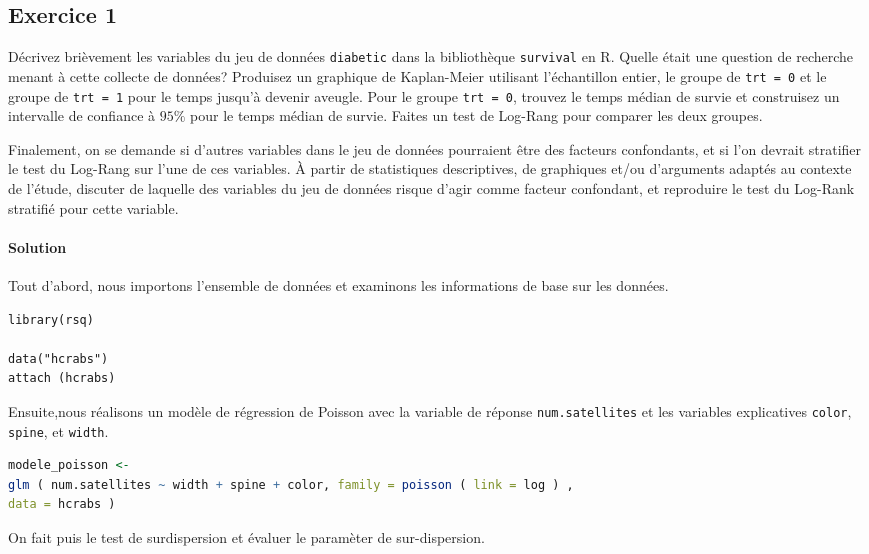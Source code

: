 \documentclass[../main.tex]{subfiles}
\begin{document}
\begin{CJK*}{UTF8}{gbsn}
\section*{Exercice 1}
Décrivez brièvement les variables du jeu de données 
\texttt{diabetic} dans la bibliothèque \texttt{survival} en R.
Quelle était une question de recherche menant à cette collecte de données?
Produisez un graphique de Kaplan-Meier utilisant l'échantillon entier,
le groupe de \texttt{trt = 0} et le groupe de \texttt{trt = 1} 
pour le temps jusqu'à devenir aveugle.
Pour le groupe \texttt{trt = 0}, trouvez le temps médian de survie et
construisez un intervalle de confiance à $95\%$ pour le temps médian de survie.
Faites un test de Log-Rang pour comparer les deux groupes.

Finalement, on se demande si d'autres variables
dans le jeu de données pourraient être des facteurs confondants, et si l'on devrait stratifier le
test du Log-Rang sur l'une de ces variables. À partir de statistiques descriptives, de graphiques
et/ou d'arguments adaptés au contexte de l'étude, discuter de laquelle des variables du jeu de
données risque d'agir comme facteur confondant, et reproduire le test du Log-Rank stratifié pour cette variable.

\paragraph{Solution}
Tout d'abord, nous importons l'ensemble de données et examinons les informations de base sur les données.

\begin{lstlisting}
library(rsq)

data("hcrabs")
attach (hcrabs)

\end{lstlisting}

Ensuite,nous réalisons 
un modèle de régression de Poisson avec la variable de réponse \texttt{num.satellites} 
et les variables explicatives \texttt{color}, \texttt{spine}, et \texttt{width}.

\begin{lstlisting}[language=R]
modele_poisson <- 
glm ( num.satellites ~ width + spine + color, family = poisson ( link = log ) ,
data = hcrabs ) 
\end{lstlisting}

On fait puis le test de surdispersion et évaluer le paramèter de sur-dispersion.


\end{CJK*}
\end{document}
